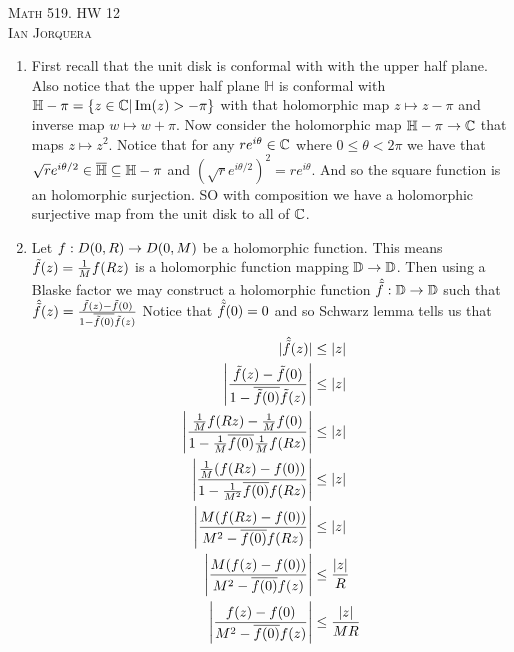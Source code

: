 \documentclass[12pt]{amsart}
\newcommand{\HH}{\mathbb{H}}
\newcommand{\D}{\mathbb{D}}
\begin{document}
\begin{center}
    \textsc{Math 519. HW 12\\ Ian Jorquera}
\end{center}
\vspace{1em}


\begin{enumerate}
\item First recall that the unit disk is conformal with with the upper half plane. Also notice that the upper half plane $\HH$ is conformal with $\HH-\pi=\{z\in\C| \Imag(z)>-\pi\}$ with that holomorphic map $z\mapsto z-\pi$ and inverse map $w\mapsto w+\pi$. 
Now consider the holomorphic map $\HH-\pi\ra \C$ that maps $z\mapsto z^2$. 
Notice that for any $re^{i\theta}\in\mathbb{C}$ where $0\leq \theta < 2\pi$ we have that $\sqrt{r}e^{i\theta/2}\in \overline{\HH}\se \HH-\pi$ and $(\sqrt{r}e^{i\theta/2})^2=re^{i\theta}$. And so the square function is an holomorphic surjection. SO with composition we have a holomorphic surjective map from the unit disk to all of $\mathbb{C}$.\\

\item Let $f:D(0,R)\rightarrow D(0,M)$ be a holomorphic function. This means $\Tilde{f}(z)=\frac{1}{M}f(Rz)$ is a holomorphic function mapping $\D\ra \D$. Then using a Blaske factor we may construct a holomorphic function $\hat{\Tilde{f}}:\D\ra\D$ such that $\hat{\Tilde{f}}(z)=\frac{\Tilde{f}(z)-\Tilde{f}(0)}{1-\overline{\Tilde{f}(0)}\Tilde{f}(z)}$ Notice that $\hat{\Tilde{f}}(0)=0$ and so Schwarz lemma tells us that 
\begin{align*}
    |\hat{\Tilde{f}}(z)| &\leq |z|\\
    \left| \frac{\Tilde{f}(z)-\Tilde{f}(0)}{1-\overline{\Tilde{f}(0)}\Tilde{f}(z)} \right|&\leq |z|\\
    \left| \frac{\frac{1}{M}f(Rz)-\frac{1}{M}f(0)}{1-\frac{1}{M}\overline{f(0)}\frac{1}{M}f(Rz)} \right|&\leq |z|\\
    \left| \frac{\frac{1}{M}(f(Rz)-f(0))}{1-\frac{1}{M^2}\overline{f(0)}f(Rz)} \right|&\leq |z|\\
    \left| \frac{M(f(Rz)-f(0))}{M^2-\overline{f(0)}f(Rz)} \right|&\leq |z|\\
    \left| \frac{M(f(z)-f(0))}{M^2-\overline{f(0)}f(z)} \right|&\leq \frac{|z|}{R}\\
    \left| \frac{f(z)-f(0)}{M^2-\overline{f(0)}f(z)} \right|&\leq \frac{|z|}{MR}\\
\end{align*}


\end{enumerate}
\end{document}
